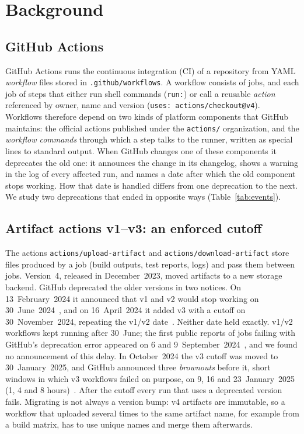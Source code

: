 \section{Background}\label{sec:background}

\subsection{GitHub Actions}
GitHub Actions runs the continuous integration (CI) of a repository from YAML \emph{workflow} files stored in \texttt{.github/workflows}.
A workflow consists of jobs, and each job of steps that either run shell commands (\texttt{run:}) or call a reusable \emph{action} referenced by owner, name and version (\texttt{uses: actions/checkout@v4}).
Workflows therefore depend on two kinds of platform components that GitHub maintains: the official actions published under the \texttt{actions/} organization, and the \emph{workflow commands} through which a step talks to the runner, written as special lines to standard output.
When GitHub changes one of these components it deprecates the old one: it announces the change in its changelog, shows a warning in the log of every affected run, and names a date after which the old component stops working.
How that date is handled differs from one deprecation to the next.
We study two deprecations that ended in opposite ways (Table~\ref{tab:events}).

\subsection{Artifact actions v1--v3: an enforced cutoff}
The actions \texttt{actions/upload-artifact} and \texttt{actions/download-artifact} store files produced by a job (build outputs, test reports, logs) and pass them between jobs.
Version~4, released in December~2023, moved artifacts to a new storage backend.
GitHub deprecated the older versions in two notices.
On 13~February~2024 it announced that v1 and v2 would stop working on 30~June~2024~\cite{gh-artifact-v12-deprecation}, and on 16~April~2024 it added v3 with a cutoff on 30~November~2024, repeating the v1/v2 date~\cite{gh-artifact-deprecation}.
Neither date held exactly.
v1/v2 workflows kept running after 30~June; the first public reports of jobs failing with GitHub's deprecation error appeared on 6 and 9~September~2024~\cite{evergreen2024artifact,reactdev2024artifact}, and we found no announcement of this delay.
In October~2024 the v3 cutoff was moved to 30~January~2025, and GitHub announced three \emph{brownouts} before it, short windows in which v3 workflows failed on purpose, on 9, 16 and 23~January~2025 (1, 4 and 8 hours)~\cite{gh-actions-breaking-2024-11,gh-artifact-brownouts}.
After the cutoff every run that uses a deprecated version fails.
Migrating is not always a version bump: v4 artifacts are immutable, so a workflow that uploaded several times to the same artifact name, for example from a build matrix, has to use unique names and merge them afterwards.

